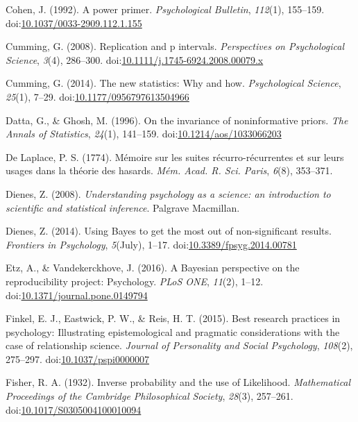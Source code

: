 \documentclass[,man, mask]{apa6}
\theoremstyle{definition}
\theoremstyle{definition}
\theoremstyle{definition}
\theoremstyle{remark}
\begin{document}
\hypertarget{ref-Cohen1992a}{}
Cohen, J. (1992). A power primer. \emph{Psychological Bulletin},
\emph{112}(1), 155--159.
doi:\href{https://doi.org/10.1037/0033-2909.112.1.155}{10.1037/0033-2909.112.1.155}

\hypertarget{ref-Cumming2008}{}
Cumming, G. (2008). Replication and p intervals. \emph{Perspectives on
Psychological Science}, \emph{3}(4), 286--300.
doi:\href{https://doi.org/10.1111/j.1745-6924.2008.00079.x}{10.1111/j.1745-6924.2008.00079.x}

\hypertarget{ref-Cumming2014}{}
Cumming, G. (2014). The new statistics: Why and how. \emph{Psychological
Science}, \emph{25}(1), 7--29.
doi:\href{https://doi.org/10.1177/0956797613504966}{10.1177/0956797613504966}

\hypertarget{ref-Datta1996}{}
Datta, G., \& Ghosh, M. (1996). On the invariance of noninformative
priors. \emph{The Annals of Statistics}, \emph{24}(1), 141--159.
doi:\href{https://doi.org/10.1214/aos/1033066203}{10.1214/aos/1033066203}

\hypertarget{ref-DeLaplace1774}{}
De Laplace, P. S. (1774). Mémoire sur les suites récurro-récurrentes et
sur leurs usages dans la théorie des hasards. \emph{Mém. Acad. R. Sci.
Paris}, \emph{6}(8), 353--371.

\hypertarget{ref-Dienes2008}{}
Dienes, Z. (2008). \emph{Understanding psychology as a science: an
introduction to scientific and statistical inference}. Palgrave
Macmillan.

\hypertarget{ref-Dienes2014}{}
Dienes, Z. (2014). Using Bayes to get the most out of non-significant
results. \emph{Frontiers in Psychology}, \emph{5}(July), 1--17.
doi:\href{https://doi.org/10.3389/fpsyg.2014.00781}{10.3389/fpsyg.2014.00781}

\hypertarget{ref-Etz2016}{}
Etz, A., \& Vandekerckhove, J. (2016). A Bayesian perspective on the
reproducibility project: Psychology. \emph{PLoS ONE}, \emph{11}(2),
1--12.
doi:\href{https://doi.org/10.1371/journal.pone.0149794}{10.1371/journal.pone.0149794}

\hypertarget{ref-Finkel2015}{}
Finkel, E. J., Eastwick, P. W., \& Reis, H. T. (2015). Best research
practices in psychology: Illustrating epistemological and pragmatic
considerations with the case of relationship science. \emph{Journal of
Personality and Social Psychology}, \emph{108}(2), 275--297.
doi:\href{https://doi.org/10.1037/pspi0000007}{10.1037/pspi0000007}

\hypertarget{ref-Fisher1932}{}
Fisher, R. A. (1932). Inverse probability and the use of Likelihood.
\emph{Mathematical Proceedings of the Cambridge Philosophical Society},
\emph{28}(3), 257--261.
doi:\href{https://doi.org/10.1017/S0305004100010094}{10.1017/S0305004100010094}
\end{document}
